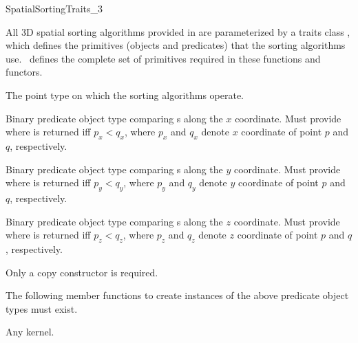 

\begin{ccRefConcept}{SpatialSortingTraits_3}

\ccDefinition
  
All 3D spatial sorting algorithms provided in \cgal{} are parameterized
by a traits class , which defines the
primitives (objects and predicates) that the sorting algorithms use.
\ccRefName\ defines the complete set of primitives required in these
functions and functors.

\ccTypes
\ccAutoIndexingOff
{}

%
       {The point type on which the sorting algorithms operate.}


%
       {Binary predicate object type comparing s
        along the $x$ coordinate.
        Must provide 
         where 
        is returned iff $p_x < q_x$,
        where $p_x$ and $q_x$ denote $x$ coordinate of point $p$ and $q$,
        respectively.
       }

%
       {Binary predicate object type comparing s
        along the $y$ coordinate.
        Must provide 
         where 
        is returned iff $p_y < q_y$,
        where $p_y$ and $q_y$ denote $y$ coordinate of point $p$ and $q$,
        respectively.
       }

%
       {Binary predicate object type comparing s
        along the $z$ coordinate.
        Must provide 
         where 
        is returned iff $p_z < q_z$,
        where $p_z$ and $q_z$ denote $z$ coordinate of point $p$ and $q$,
        respectively.
       }


\ccCreation
{}  %

Only a copy constructor is required.


\ccOperations

The following member functions to create instances of the above predicate
object types must exist. 

\setlength\parskip{0mm}
\ccGlue
{}
\ccGlue
{}

\ccParDims
\ccHasModels

Any \cgal{} kernel.

\ccParDims
\end{ccRefConcept}


